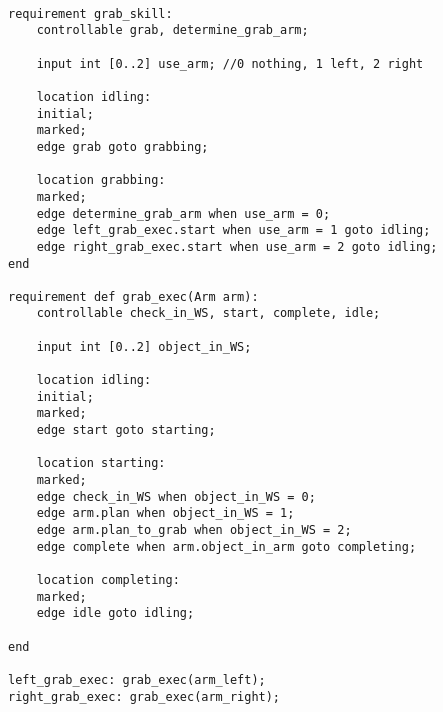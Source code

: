 \begin{center}
\begin{minipage}{0.95\columnwidth}
\begin{lstlisting}[caption=CIF model of grab skill requirement, label=code:grab_skill, language=CIF]%, linewidth=0.8\columnwidt

requirement grab_skill:
    controllable grab, determine_grab_arm;

    input int [0..2] use_arm; //0 nothing, 1 left, 2 right

    location idling:
    initial;
    marked;
    edge grab goto grabbing;

    location grabbing:
    marked;
    edge determine_grab_arm when use_arm = 0;
    edge left_grab_exec.start when use_arm = 1 goto idling;
    edge right_grab_exec.start when use_arm = 2 goto idling;
end

requirement def grab_exec(Arm arm):
    controllable check_in_WS, start, complete, idle;

    input int [0..2] object_in_WS;

    location idling:
    initial;
    marked;
    edge start goto starting;

    location starting:
    marked;
    edge check_in_WS when object_in_WS = 0;
    edge arm.plan when object_in_WS = 1;
    edge arm.plan_to_grab when object_in_WS = 2;
    edge complete when arm.object_in_arm goto completing;

    location completing:
    marked;
    edge idle goto idling;

end

left_grab_exec: grab_exec(arm_left);
right_grab_exec: grab_exec(arm_right);
\end{lstlisting}
\end{minipage}
\end{center}

